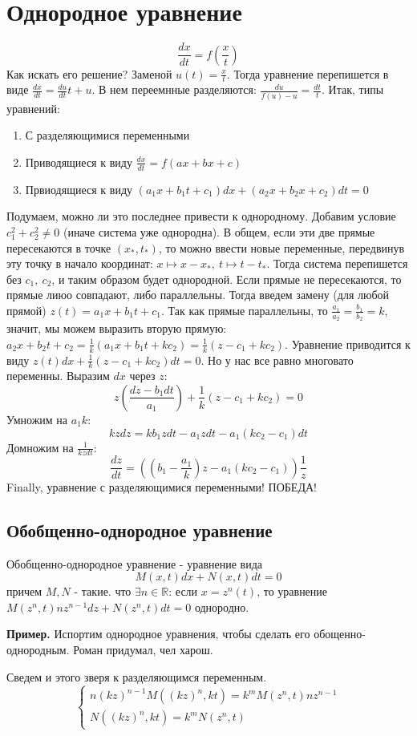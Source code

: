 \section{Однородное уравнение}
$$\frac{dx}{dt}=f(\frac{x}{t})$$ 
Как искать его решение? Заменой $u(t)=\frac{x}{t}$. 
Тогда уравнение перепишется в виде $\frac{dx}{dt}=\frac{du}{dt}t+u$.
В нем переемнные разделяются: $\frac{du}{f(u)-u}=\frac{dt}{t}$. 
Итак, типы уравнений:
\begin{enumerate}
    \item С разделяющимися переменными
    \item Приводящиеся к виду $\frac{dx}{dt}=f(ax+bx+c)$ 
    \item Првиодящиеся к виду $(a_1x+b_1t+c_1)dx+(a_2x+b_2x+c_2)dt=0$
\end{enumerate}
Подумаем, можно ли это последнее привести к однородному. Добавим условие 
$c_1^2+c_2^2\ne0$ (иначе система уже однородна). В общем, если эти 
две прямые пересекаются в точке
$(x_*,t_*)$, то можно ввести новые переменные, передвинув эту точку в начало
координат: $x\mapsto x-x_*,~t\mapsto t-t_*$. Тогда система перепишется 
без $c_1,~c_2$, и таким образом будет однородной. Если прямые не пересекаются, 
то прямые лиюо совпадают, либо параллельны. Тогда введем замену (для любой 
прямой) $z(t)=a_1x+b_1t+c_1$. Так как прямые параллельны, то
$\frac{a_1}{a_2}=\frac{b_1}{b_2}=k$, значит, мы можем выразить 
вторую прямую: $a_2x+b_2t+c_2=\frac{1}{k}(a_1x+b_1t+kc_2)=\frac{1}{k}(z-
c_1+kc_2)$. Уравнение приводится к виду $z(t)dx+\frac{1}{k}(z-c_1+kc_2)dt=0$.
Но у нас все равно многовато переменны. Выразим $dx$ через  $z$:
$$z(\frac{dz-b_1dt}{a_1})+\frac{1}{k}(z-c_1+kc_2)=0$$ 
Умножим на $a_1k$:
 $$kzdz=kb_1zdt-a_1zdt-a_1(kc_2-c_1)dt$$ 
Домножим на $\frac{1}{kzdt}$:
$$\frac{dz}{dt}=((b_1-\frac{a_1}{k})z-a_1(kc_2-c_1))\frac{1}{z}$$ 
Finally, уравнение с разделяющимися переменными! ПОБЕДА!
\subsection{Обобщенно-однородное уравнение}
\begin{defin}
Обобщенно-однородное уравнение - уравнение вида
$$M(x,t)dx+N(x,t)dt=0$$ 
причем $M,N$ - такие. что  $\exists n\in\mathbb{R}$: если
$x=z^n(t)$, то уравнение  $M(z^n,t)nz^{n-1}dz+N(z^n,t)dt=0$ однородно.
\end{defin}
\textbf{Пример.} Испортим однородное уравнения, чтобы сделать его 
обощенно-однородным. Роман придумал, чел харош.

Сведем и этого зверя к разделяющимся переменным. 
$$\begin{cases}
    n(kz)^{n-1}M((kz)^n,kt)=k^mM(z^n,t)nz^{n-1}\\
    N((kz)^n,kt)=k^mN(z^n,t)
\end{cases}$$ 

